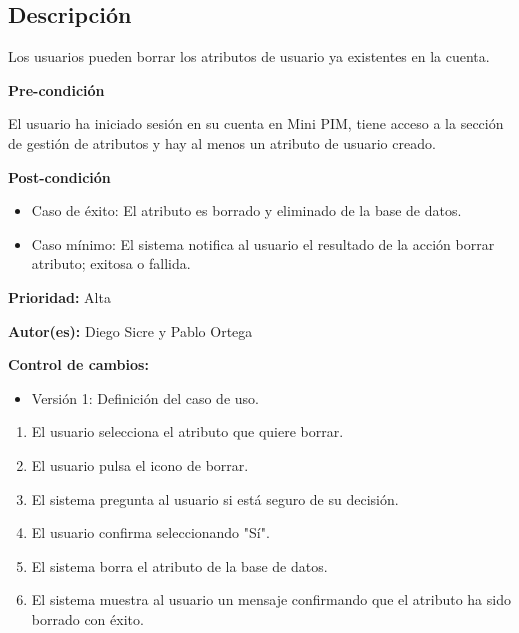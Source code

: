 

\subsection*{Descripción}
Los usuarios pueden borrar los atributos de usuario ya existentes en la cuenta.
\vspace{0.15cm}

\textbf{Pre-condición}\par
El usuario ha iniciado sesión en su cuenta en Mini PIM, tiene acceso a la sección de gestión de atributos y hay al menos un atributo de usuario creado.\par
\vspace{0.15cm}

\textbf{Post-condición}
\begin{itemize}
    \item Caso de éxito: El atributo es borrado y eliminado de la base de datos.
    \item Caso mínimo: El sistema notifica al usuario el resultado de la acción borrar atributo; exitosa o fallida.
\end{itemize}

\textbf{Prioridad: }
Alta
\vspace{0.15cm}

\textbf{Autor(es): }
Diego Sicre y Pablo Ortega\par
\vspace{0.15cm}

\textbf{Control de cambios: }
\begin{itemize}
    \item Versión 1: Definición del caso de uso.
\end{itemize}


\begin{enumerate}
    \item El usuario selecciona el atributo que quiere borrar.
    \item El usuario pulsa el icono de borrar.
    \item El sistema pregunta al usuario si está seguro de su decisión.
    \item El usuario confirma seleccionando "Sí".
    \item El sistema borra el atributo de la base de datos.
    \item El sistema muestra al usuario un mensaje confirmando que el atributo ha sido borrado con éxito.
\end{enumerate}

